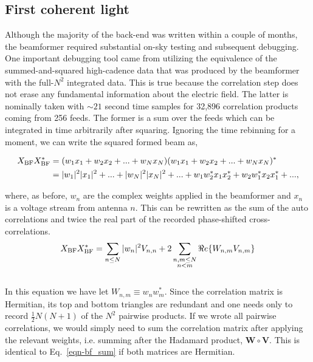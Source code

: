 \subsection{First coherent light}
Although the majority of the back-end was written within a couple  
of months, the beamformer required substantial 
on-sky testing and subsequent debugging. One important debugging tool 
came from utilizing the equivalence of the summed-and-squared
high-cadence data that was produced by the beamformer with the 
full-$N^2$ integrated data. This is true because the correlation 
step does not erase any fundamental information about the electric field. 
The latter is nominally taken with $\sim21$ second
time samples for 32,896 correlation products coming from 256 feeds. 
The former is a sum over the feeds which can be integrated in time 
arbitrarily after squaring. Ignoring the time rebinning for a moment,
we can write the squared formed beam as,

\begin{align}
X_{\rm BF} X_{\rm BF}^* &= (w_1 x_1 + w_2 x_2 + ... + w_N x_N) (w_1 x_1 + w_2 x_2 + ... + w_N x_N)^*\\
&= |w_1|^2|x_1|^2 + ... + |w_N|^2|x_N|^2 + ... + w_1 w_2^* x_1 x_2^* + w_2 w_1^* x_2 x_1^* + ... , 
\end{align}

\noindent where, as before, $w_n$ are the 
complex weights applied in the beamformer 
and $x_n$ is a voltage stream from antenna $n$.
This can be rewritten as the sum of the 
auto correlations and twice the real part of the recorded 
phase-shifted cross-correlations.
\\

\begin{equation}
\label{eqn-bf_sum}
X_{\rm BF} X_{\rm BF}^* = \sum_{n\le N} |w_n|^2 V_{n, n} + 
2 \sum_{\substack{n,m\le N \\ n<m}} \Re e\{W_{n, m} V_{n, m}\}
\end{equation}
\\

In this equation we have let $W_{n, m} \equiv w_n w_m^*$.
Since the correlation matrix is Hermitian, its top 
and bottom triangles are redundant and one needs only to 
record $\frac{1}{2} N (N+1)$ of the $N^2$ pairwise products.
If we wrote all pairwise correlations, we would simply need 
to sum the correlation matrix after applying the relevant 
weights, i.e. summing after the Hadamard
product, $\mathbf{W} \circ \mathbf{V}$. This is identical 
to Eq.~\ref{eqn-bf_sum} if both matrices are Hermitian. 

